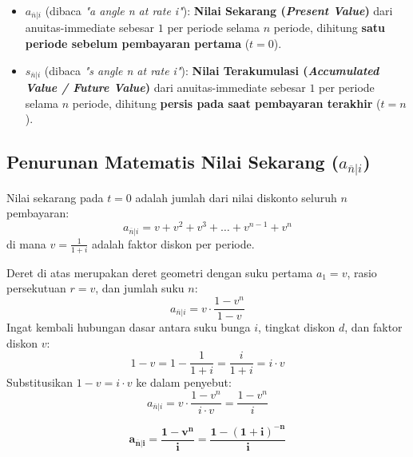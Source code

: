 \documentclass[11pt,a4paper]{article}
\begin{document}
\begin{definitionbox}
\begin{itemize}[leftmargin=1.5em]
    \item $a_{\overline{n}|i}$ (dibaca \textit{"a angle n at rate i"}): \textbf{Nilai Sekarang (\textit{Present Value})} dari anuitas-immediate sebesar $1$ per periode selama $n$ periode, dihitung \textbf{satu periode sebelum pembayaran pertama} ($t = 0$).
    \item $s_{\overline{n}|i}$ (dibaca \textit{"s angle n at rate i"}): \textbf{Nilai Terakumulasi (\textit{Accumulated Value / Future Value})} dari anuitas-immediate sebesar $1$ per periode selama $n$ periode, dihitung \textbf{persis pada saat pembayaran terakhir} ($t = n$).
\end{itemize}
\end{definitionbox}

\subsection{Penurunan Matematis Nilai Sekarang (\texorpdfstring{$a_{\overline{n}|i}$}{a\_n|i})}

Nilai sekarang pada $t = 0$ adalah jumlah dari nilai diskonto seluruh $n$ pembayaran:
\begin{equation}
    a_{\overline{n}|i} = v + v^2 + v^3 + \dots + v^{n-1} + v^n
\end{equation}
di mana $v = \frac{1}{1+i}$ adalah faktor diskon per periode.

Deret di atas merupakan deret geometri dengan suku pertama $a_1 = v$, rasio persekutuan $r = v$, dan jumlah suku $n$:
\begin{equation}
    a_{\overline{n}|i} = v \cdot \frac{1 - v^n}{1 - v}
\end{equation}
Ingat kembali hubungan dasar antara suku bunga $i$, tingkat diskon $d$, dan faktor diskon $v$:
\begin{equation}
    1 - v = 1 - \frac{1}{1+i} = \frac{i}{1+i} = i \cdot v
\end{equation}
Substitusikan $1 - v = i \cdot v$ ke dalam penyebut:
\begin{equation}
    a_{\overline{n}|i} = v \cdot \frac{1 - v^n}{i \cdot v} = \frac{1 - v^n}{i}
\end{equation}

\begin{definitionbox}
\begin{equation}
    \mathbf{a_{\overline{n}|i} = \frac{1 - v^n}{i} = \frac{1 - (1+i)^{-n}}{i}}
\end{equation}
\end{definitionbox}
\end{document}
